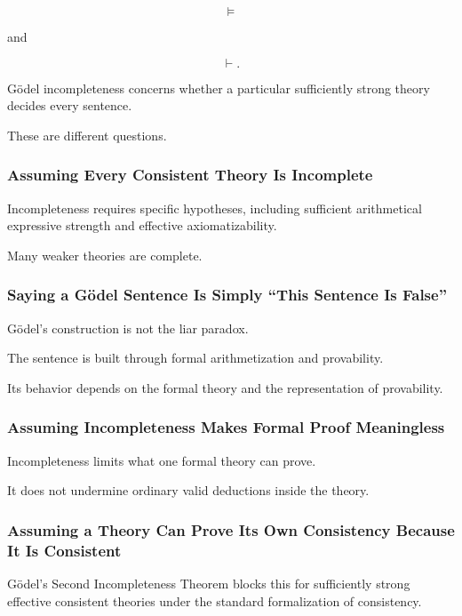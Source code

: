 \[
\models
\]

and

\[
\vdash.
\]

Gödel incompleteness concerns whether a particular sufficiently strong
theory decides every sentence.

These are different questions.

\subsubsection{Assuming Every Consistent Theory Is Incomplete}

Incompleteness requires specific hypotheses, including sufficient
arithmetical expressive strength and effective axiomatizability.

Many weaker theories are complete.

\subsubsection{Saying a Gödel Sentence Is Simply ``This Sentence Is False''}

Gödel's construction is not the liar paradox.

The sentence is built through formal arithmetization and provability.

Its behavior depends on the formal theory and the representation of
provability.

\subsubsection{Assuming Incompleteness Makes Formal Proof Meaningless}

Incompleteness limits what one formal theory can prove.

It does not undermine ordinary valid deductions inside the theory.

\subsubsection{Assuming a Theory Can Prove Its Own Consistency Because It Is Consistent}

Gödel's Second Incompleteness Theorem blocks this for sufficiently strong
effective consistent theories under the standard formalization of
consistency.

